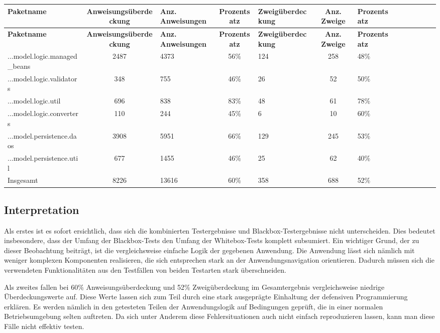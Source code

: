 \documentclass{article}
\begin{document}
\begin{longtable}{@{}lclclclclclcl@{}}
\toprule
\textbf{Paketname} & \textbf{Anweisungsüberdeckung} & \textbf{Anz. Anweisungen} & \textbf{Prozentsatz} & \textbf{Zweigüberdeckung} & \textbf{Anz. Zweige} & \textbf{Prozentsatz} \\* \midrule
\endfirsthead
\textbf{Paketname} & \textbf{Anweisungsüberdeckung} & \textbf{Anz. Anweisungen} & \textbf{Prozentsatz} & \textbf{Zweigüberdeckung} & \textbf{Anz. Zweige} & \textbf{Prozentsatz} \\* \midrule
\endhead
...model.logic.managed\_beans 	& 2487 		& 4373 		& 56\% 		& 124 		& 258 		& 48\% \\
...model.logic.validators 		& 348 		& 755 		& 46\% 		& 26 			& 52 			& 50\% \\
...model.logic.util 			& 696 		& 838 		& 83\% 		& 48 			& 61 			& 78\% \\
...model.logic.converters 		& 110 		& 244 		& 45\% 		& 6 			& 10 			& 60\% \\
...model.persistence.daos 		& 3908 		& 5951 		& 66\% 		& 129 		& 245 		& 53\% \\
...model.persistence.util 		& 677 		& 1455 		& 46\% 		& 25 			& 62 			& 40\% \\
Insgesamt 						& 8226            	& 13616            & 60\%            	& 358            	& 688            	& 52\% \\* \bottomrule
\end{longtable}

\subsection{Interpretation}

Als erstes ist es sofort ersichtlich, dass sich die kombinierten Testergebnisse und Blackbox-Testergebnisse nicht unterscheiden. 
Dies bedeutet insbesondere, dass der Umfang der Blackbox-Tests den Umfang der Whitebox-Tests komplett subsumiert. 
Ein wichtiger Grund, der zu dieser Beobachtung beiträgt, ist die vergleichsweise einfache Logik der gegebenen Anwendung. 
Die Anwendung lässt sich nämlich mit weniger komplexen Komponenten realisieren, die sich entsprechen stark an der Anwendungsnavigation orientieren. 
Dadurch müssen sich die verwendeten Funktionalitäten aus den Testfällen von beiden Testarten stark überschneiden.

Als zweites fallen bei 60\% Anweisungsüberdeckung und 52\% Zweigüberdeckung im Gesamtergebnis vergleichsweise niedrige Überdeckungswerte auf. 
Diese Werte lassen sich zum Teil durch eine stark ausgeprägte Einhaltung der defensiven Programmierung erklären. 
Es werden nämlich in den getesteten Teilen der Anwendungslogik auf Bedingungen geprüft, die in einer normalen Betriebsumgebung selten auftreten. 
Da sich unter Anderem diese Fehlersituationen auch nicht einfach reproduzieren lassen, kann man diese Fälle nicht effektiv testen. 
\end{document}
